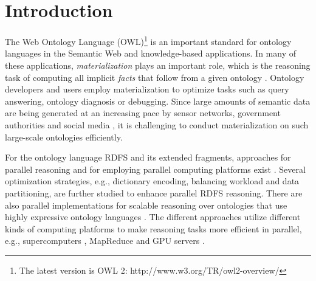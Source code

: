 \section{Introduction}
\label{sec:introduction}

The Web Ontology Language (OWL)\footnote{The latest version is OWL 2: http://www.w3.org/TR/owl2-overview/}
is an important standard for ontology languages in the Semantic Web and knowledge-based applications.
In many of these applications, \emph{materialization} plays an important role, which is the reasoning task of computing all implicit
\emph{facts} that follow from a given ontology \cite{handbook}. Ontology developers and users employ materialization to optimize tasks such as query answering, ontology diagnosis or debugging. Since large amounts of semantic data
are being generated at an increasing pace by sensor networks, government authorities and social
media \cite{LehmbergRMB16,MeuselBP15}, it is challenging to conduct materialization on such large-scale ontologies efficiently.

For the ontology language RDFS and its extended fragments, approaches for parallel reasoning and for employing parallel computing platforms exist
 \cite{MotikNPHO14,PetersSZ15,SubercazeGCL16}. Several optimization strategies, e.g., dictionary encoding, balancing workload
and data partitioning, are further studied to enhance parallel RDFS reasoning. There are also parallel implementations for scalable
reasoning over ontologies that use highly expressive ontology languages \cite{SteigmillerLG14,WuH12}. The different approaches utilize different kinds of computing platforms to make reasoning tasks more efficient in parallel, e.g., supercomputers \cite{Hoeksema2011,GoodmanJMAAH11},
MapReduce \cite{UrbaniKMHB12} and GPU servers \cite{HeinoP12}.

